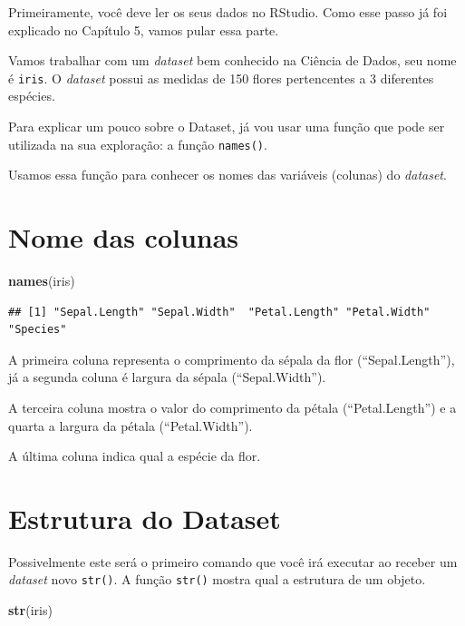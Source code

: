 \documentclass[
]{book}
\newenvironment{Shaded}{\begin{snugshade}}{\end{snugshade}}
\newcommand{\KeywordTok}[1]{\textcolor[rgb]{0.13,0.29,0.53}{\textbf{#1}}}
\newcommand{\NormalTok}[1]{#1}
\begin{document}
Primeiramente, você deve ler os seus dados no RStudio. Como esse passo
já foi explicado no Capítulo 5, vamos pular essa parte.

Vamos trabalhar com um \emph{dataset} bem conhecido na Ciência de Dados,
seu nome é \texttt{iris}. O \emph{dataset} possui as medidas de 150
flores pertencentes a 3 diferentes espécies.

Para explicar um pouco sobre o Dataset, já vou usar uma função que pode
ser utilizada na sua exploração: a função \texttt{names()}.

Usamos essa função para conhecer os nomes das variáveis (colunas) do
\emph{dataset}.

\hypertarget{nome-das-colunas}{%
\section{Nome das colunas}\label{nome-das-colunas}}

\begin{Shaded}
\begin{Highlighting}[]
\KeywordTok{names}\NormalTok{(iris)}
\end{Highlighting}
\end{Shaded}

\begin{verbatim}
## [1] "Sepal.Length" "Sepal.Width"  "Petal.Length" "Petal.Width"  "Species"
\end{verbatim}

A primeira coluna representa o comprimento da sépala da flor
(``Sepal.Length''), já a segunda coluna é largura da sépala
(``Sepal.Width'').

A terceira coluna mostra o valor do comprimento da pétala
(``Petal.Length'') e a quarta a largura da pétala (``Petal.Width'').

A última coluna indica qual a espécie da flor.

\hypertarget{estrutura-do-dataset}{%
\section{Estrutura do Dataset}\label{estrutura-do-dataset}}

Possivelmente este será o primeiro comando que você irá executar ao
receber um \emph{dataset} novo \texttt{str()}. A função \texttt{str()}
mostra qual a estrutura de um objeto.

\begin{Shaded}
\begin{Highlighting}[]
\KeywordTok{str}\NormalTok{(iris)}
\end{Highlighting}
\end{Shaded}
\end{document}
